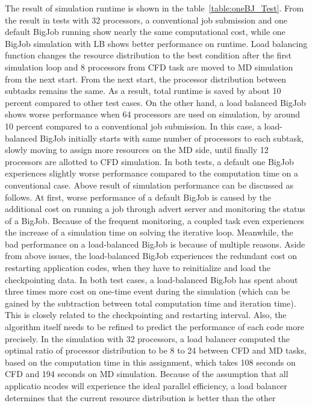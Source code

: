 \documentclass[conference,final]{IEEEtran}
\begin{document}
The result of simulation runtime is shown in the table~\ref{table:oneBJ_Test}. From the result in tests with 32 processors, a conventional job submission and one default BigJob running show nearly the same computational cost, while one BigJob simulation with LB shows better performance on runtime. Load balancing function changes the resource distribution to the best condition after the first simulation loop and 8 processors from CFD task are moved to MD simulation from the next start. From the next start, the processor distribution between subtasks remains the same. As a result, total runtime is saved by about 10 percent compared to other test cases. On the other hand, a load balanced BigJob shows worse performance when 64 processors are used on simulation, by around 10 percent compared to a conventional job submission. In this case, a load-balanced BigJob initially starts with same number of processors to each subtask, slowly moving to assign more resources on the MD side, until finally 12 processors are allotted to CFD simulation. In both tests, a default one BigJob experiences slightly worse performance compared to the computation time on a conventional case.
Above result of simulation performance can be discussed as follows. At first, worse performance of a default BigJob is caused by the additional cost on running a job through advert server and monitoring the status of a BigJob. Because of the frequent monitoring, a coupled task even experiences the increase of a simulation time on solving the iterative loop. Meanwhile, the bad performance on a load-balanced BigJob is because of multiple reasons. Aside from above issues, the load-balanced BigJob experiences the redundant cost on restarting application codes, when they have to reinitialize and load the checkpointing data. In both test cases, a load-balanced BigJob has spent about three times more cost on one-time event during the simulation (which can be gained by the subtraction between total computation time and iteration time). This is closely related to the checkpointing and restarting interval. Also, the algorithm itself needs to be refined to predict the performance of each code more precisely. In the simulation with 32 processors, a load balancer computed the optimal ratio of processor distribution to be 8 to 24 between CFD and MD tasks, based on the computation time in this assignment, which takes 108 seconds on CFD and 194 seconds on MD simulation. Because of the assumption that all applicatio ncodes will experience the ideal parallel efficiency, a load balancer determines that the current resource distribution is better than the other 
\end{document}
